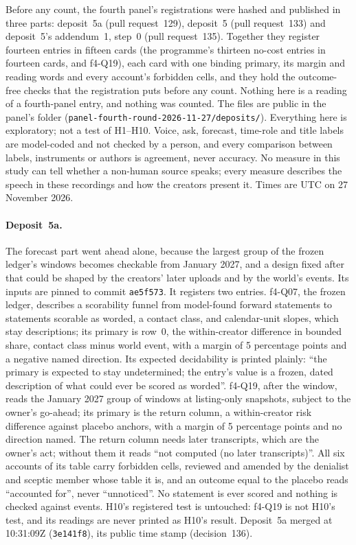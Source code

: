 Before any count, the fourth panel's registrations were hashed and published in three parts: deposit~5a (pull
request~129), deposit~5 (pull request~133) and deposit~5's addendum~1, step~0 (pull request~135). Together they register
fourteen entries in fifteen cards (the programme's thirteen no-cost entries in fourteen cards, and f4-Q19), each card
with one binding primary, its margin and reading words and every account's forbidden cells, and
they hold the outcome-free checks that the registration puts before any count. Nothing here is a reading of a
fourth-panel entry, and nothing was counted. The files are public in the panel's folder
(\texttt{panel-fourth-round-2026-11-27/}\allowbreak\texttt{deposits/}). Everything here is exploratory; not a test of H1--H10. Voice, ask,
forecast, time-role and title labels are model-coded and not checked by a person, and every comparison between labels,
instruments or authors is agreement, never accuracy. No measure in this study can tell whether a non-human source speaks;
every measure describes the speech in these recordings and how the creators present it. Times are UTC on 27 November
2026.

\paragraph{Deposit~5a.} The forecast part went ahead alone, because the largest group of the frozen ledger's windows
becomes checkable from January 2027, and a design fixed after that could be shaped by the creators' later uploads and by
the world's events. Its inputs are pinned to commit \texttt{ae5f573}. It registers two entries. f4-Q07, the frozen
ledger, describes a scorability funnel from model-found forward statements to statements scorable as worded, a contact
class, and calendar-unit slopes, which stay descriptions; its primary is row~0, the within-creator difference in bounded
share, contact class minus world event, with a margin of 5 percentage points and a negative named direction. Its expected
decidability is printed plainly: ``the primary is expected to stay undetermined; the entry's value is a frozen, dated
description of what could ever be scored as worded''. f4-Q19, after the window, reads the January 2027 group of windows
at listing-only snapshots, subject to the owner's go-ahead; its primary is the return column, a within-creator risk
difference against placebo anchors, with a margin of 5 percentage points and no direction named. The return column needs
later transcripts, which are the owner's act; without them it reads ``not computed (no later transcripts)''. All six accounts of its
table carry forbidden cells, reviewed and amended by the denialist and sceptic member whose table it is, and an outcome
equal to the placebo reads ``accounted for'', never ``unnoticed''. No statement is ever scored and nothing is checked
against events. H10's registered test is untouched: f4-Q19 is not H10's test, and its readings are never printed as H10's
result. Deposit~5a merged at 10:31:09Z (\texttt{3e141f8}), its public time stamp (decision~136).

